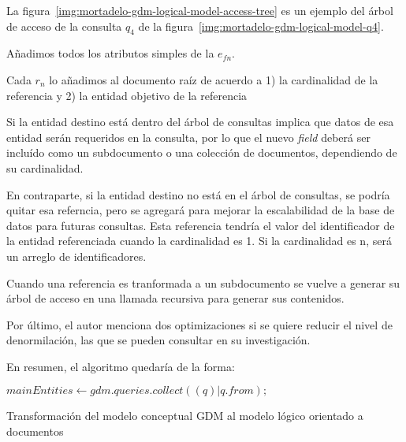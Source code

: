 La figura~\ref{img:mortadelo-gdm-logical-model-access-tree} es un ejemplo del árbol de acceso de la consulta $q_{4}$ de la figura~\ref{img:mortadelo-gdm-logical-model-q4}.


Añadimos todos los atributos simples de la $e_{fn}$.


Cada $r_{n}$ lo añadimos al documento raíz de acuerdo a 1) la cardinalidad de la referencia y 2) la entidad objetivo de la referencia


Si la entidad destino está dentro del árbol de consultas implica que datos de esa entidad serán requeridos en la consulta, por lo que el nuevo \textit{field} deberá ser incluído como un subdocumento o una colección de documentos, dependiendo de su cardinalidad.

En contraparte, si la entidad destino no está en el árbol de consultas, se podría quitar esa referncia, pero se agregará para mejorar la escalabilidad de la base de datos para futuras consultas. Esta referencia tendría el valor del identificador de la entidad referenciada cuando la cardinalidad es 1. Si la cardinalidad es n, será un arreglo de identificadores.


Cuando una referencia es tranformada a un subdocumento se vuelve a generar su árbol de acceso en una llamada recursiva para generar sus contenidos.


Por último, el autor menciona dos optimizaciones si se quiere reducir el nivel de denormilación, las que se pueden consultar en su investigación\cite{de_la_vega_mortadelo_2020}.

En resumen, el algoritmo quedaría de la forma:
\begin{algorithm}

    $mainEntities \gets gdm.queries.collect((q)|q.from);$\\
    
    \caption{Transformación del modelo conceptual GDM al modelo lógico orientado a documentos}
\end{algorithm}

